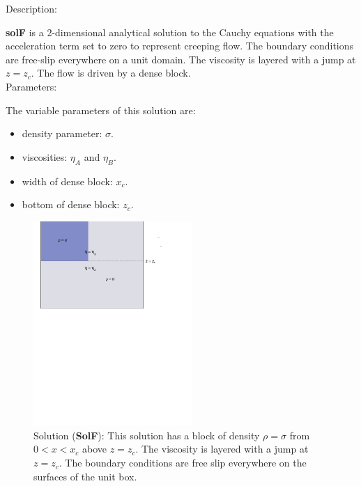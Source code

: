   {\large \fontB Description:}
  
  {\bf solF} is a 2-dimensional analytical solution to the Cauchy equations with the acceleration term set to zero
  to represent creeping flow. The boundary conditions are free-slip everywhere on a unit domain. The viscosity is layered with a jump at $ z=z_c $.
  The flow is driven by a dense block.
  \\

  {\large \fontB Parameters:}
 
 The variable parameters of this solution are:
 \begin{itemize}
   \item{density parameter: $ \sigma $.}
   \item{viscosities: $\eta_A$ and $\eta_B$.}
   \item{width of dense block: $x_c$.}
   \item{bottom of dense block: $z_c$.}
 \end{itemize}

  \begin{figure}
    \includegraphics[width=6cm,clip]{../figs/figF.pdf}
    \caption[Short caption]{\label{figF} 
      Solution ({\bf SolF}):
      This solution has a block of density $\rho = \sigma$ from $0 < x < x_c$ above
      $ z= z_c$.
      The viscosity is layered with a jump at $ z=z_c $.
      The boundary conditions are free slip everywhere on the surfaces of the unit box.}
  \end{figure} 
  

